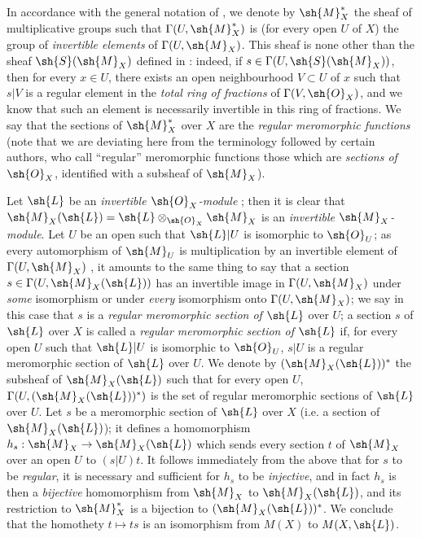 \begin{env}[20.1.8]
\label{IV.20.1.8}
In accordance with the general notation of , we denote by $\sh{M}_X^*$ the sheaf of multiplicative groups such that $\Gamma(U,\sh{M}_X^*)$ is (for every open $U$ of $X$) the group of \emph{invertible elements} of $\Gamma(U,\sh{M}_X)$.
This sheaf is none other than the sheaf $\sh{S}(\sh{M}_X)$ defined in :
indeed, if $s\in\Gamma(U,\sh{S}(\sh{M}_X))$, then for every $x\in U$, there exists an open neighbourhood $V\subset U$ of $x$ such that $s|V$ is a regular element in the \emph{total ring of fractions} of $\Gamma(V,\sh{O}_X)$, and we know that such an element is necessarily invertible in this ring of fractions.
We say that the sections of $\sh{M}_X^*$ over $X$ are the \emph{regular meromorphic functions} (note that we are deviating here from the terminology followed by certain authors, who call ``regular'' meromorphic functions those which are \emph{sections of $\sh{O}_X$}, identified with a subsheaf of $\sh{M}_X$).

Let $\sh{L}$ be an \emph{invertible $\sh{O}_X$-module} ;
then it is clear that $\sh{M}_X(\sh{L})=\sh{L}\otimes_{\sh{O}_X}\sh{M}_X$
is an \emph{invertible $\sh{M}_X$-module}.
Let $U$ be an open such that $\sh{L}|U$ is isomorphic to $\sh{O}_U$;
as every automorphism of $\sh{M}_U$ is multiplication by an invertible element of $\Gamma(U,\sh{M}_X)$ , it amounts to the same thing to say that a section $s\in\Gamma(U,\sh{M}_X(\sh{L}))$ has an invertible image in $\Gamma(U,\sh{M}_X)$ under \emph{some} isomorphism or under \emph{every} isomorphism onto $\Gamma(U,\sh{M}_X)$;
we say in this case that $s$ is a \emph{regular meromorphic section of $\sh{L}$} over $U$;
a section $s$ of $\sh{L}$ over $X$ is called a \emph{regular meromorphic section of $\sh{L}$} if, for every open $U$ such that $\sh{L}|U$ is isomorphic to $\sh{O}_U$, $s|U$ is a regular meromorphic section of $\sh{L}$ over $U$.
We denote by $(\sh{M}_X(\sh{L}))^*$ the subsheaf of $\sh{M}_X(\sh{L})$ such that for every open $U$, $\Gamma(U,(\sh{M}_X(\sh{L}))^*)$ is the set of regular meromorphic sections of $\sh{L}$ over $U$.
Let $s$ be a meromorphic section of $\sh{L}$ over $X$ (i.e. a section of $\sh{M}_X(\sh{L})$);
it defines a homomorphism $h_s:\sh{M}_X\to\sh{M}_X(\sh{L})$ which sends every section $t$ of $\sh{M}_X$ over an open $U$ to $(s|U)t$.
It follows immediately from the above that for $s$ to be \emph{regular}, it is necessary and sufficient for $h_s$ to be \emph{injective}, and in fact $h_s$ is then a \emph{bijective} homomorphism from $\sh{M}_X$ to $\sh{M}_X(\sh{L})$, and its restriction to $\sh{M}_X^*$ is a bijection to $(\sh{M}_X(\sh{L}))^*$.
We conclude that the homothety $t\mapsto ts$ is an isomorphism from $M(X)$ to $M(X,\sh{L})$.
\end{env}

